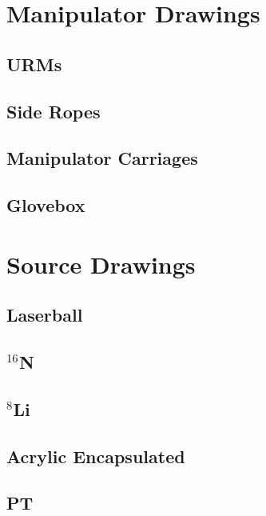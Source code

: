   

\chapter{Manipulator Drawings}
\section{URMs}
\section{Side Ropes}
\section{Manipulator Carriages}
\section{Glovebox}


\chapter{Source Drawings}


\section{Laserball}
\section{$^{16}$N} 
\section{$^{8}$Li}
\section{Acrylic Encapsulated}
\section{PT}
